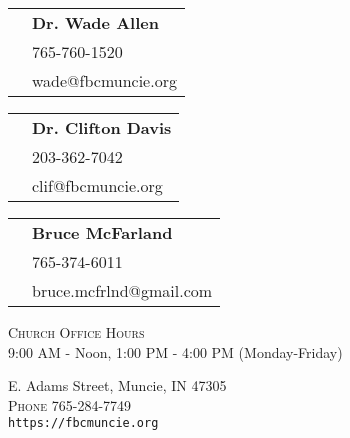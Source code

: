 \documentclass[
notumble,
nofoldmark,
letterpaper,
10pt,
]{leaflet}
\newcommand{\phone}[1]{\small{\faPhone \hspace{.2em} #1}}
\newcommand{\email}[1]{\small{\faEnvelopeO \hspace{.2em} #1}}
\newcommand{\pastor}[4]{
\begin{tabular}{r l}
\textsc{\multirow[t]{3}{8em}{#1}} & \textbf{#2} \\
 & \phone{#3} \\
 & \email{#4} \\
 \end{tabular}
 \newline
\vspace*{2mm}
\newline
}
\begin{document}
\vfill



\vfill

\pastor{Pastor}{Dr. Wade Allen}{765-760-1520}{wade@fbcmuncie.org}
\pastor{Worship Arts Pastor}{Dr. Clifton Davis}{203-362-7042}{clif@fbcmuncie.org}
\pastor{Choir Director}{Bruce McFarland}{765-374-6011}{bruce.mcfrlnd@gmail.com}

\pagebreak



\vfill



\vfill



\vfill


\centering
\textsc{Church Office Hours} \\
9:00 AM - Noon, 1:00 PM - 4:00 PM (Monday-Friday)

\medskip

 E. Adams Street, Muncie, IN 47305\\
\textsc{Phone} 765-284-7749\\
\texttt{https://fbcmuncie.org}

\loggingall
\end{document}
